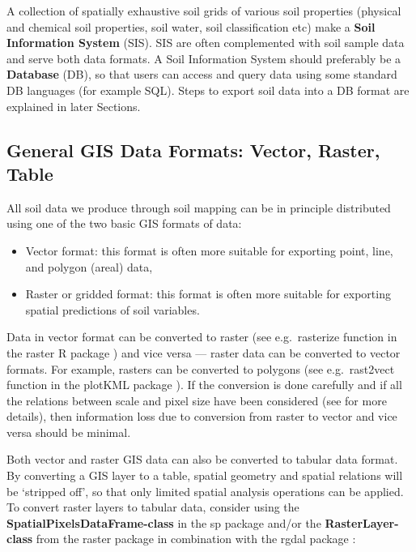 \documentclass[10pt,b5paper,]{book}
\providecommand{\tightlist}{%
  \setlength{\itemsep}{0pt}\setlength{\parskip}{0pt}}
\theoremstyle{definition}
\theoremstyle{definition}
\theoremstyle{definition}
\theoremstyle{remark}
\begin{document}
A collection of spatially exhaustive soil grids of various soil
properties (physical and chemical soil properties, soil water, soil
classification etc) make a \textbf{Soil Information System} (SIS). SIS
are often complemented with soil sample data and serve both data
formats. A Soil Information System should preferably be a
\textbf{Database} (DB), so that users can access and query data using
some standard DB languages (for example SQL). Steps to export soil data
into a DB format are explained in later Sections.

\hypertarget{general-gis-data-formats-vector-raster-table}{%
\subsection{General GIS Data Formats: Vector, Raster,
Table}\label{general-gis-data-formats-vector-raster-table}}

All soil data we produce through soil mapping can be in principle
distributed using one of the two basic GIS formats of data:

\begin{itemize}
\tightlist
\item
  Vector format: this format is often more suitable for exporting point,
  line, and polygon (areal) data,
\item
  Raster or gridded format: this format is often more suitable for
  exporting spatial predictions of soil variables.
\end{itemize}

Data in vector format can be converted to raster (see e.g.~rasterize
function in the raster R package ) and vice versa --- raster data can be
converted to vector formats. For example, rasters can be converted to
polygons (see e.g.~rast2vect function in the plotKML package ). If the
conversion is done carefully and if all the relations between scale and
pixel size have been considered (see \citet{hengl2006finding} for more
details), then information loss due to conversion from raster to vector
and vice versa should be minimal.

Both vector and raster GIS data can also be converted to tabular data
format. By converting a GIS layer to a table, spatial geometry and
spatial relations will be `stripped off', so that only limited spatial
analysis operations can be applied. To convert raster layers to tabular
data, consider using the \textbf{SpatialPixelsDataFrame-class} in the sp
package and/or the \textbf{RasterLayer-class} from the raster package in
combination with the rgdal package \citep{bivand2013classes}:
\end{document}

